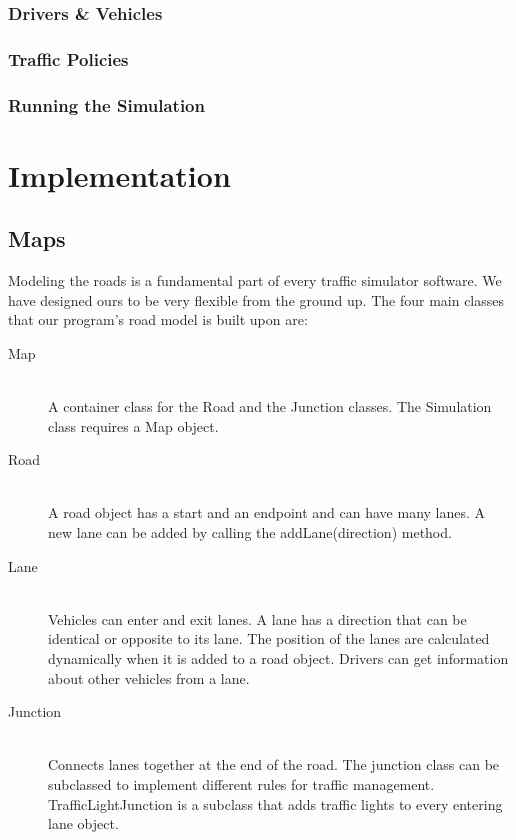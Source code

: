 \documentclass[11pt]{article}
\begin{document}
\subsubsection{Drivers \& Vehicles}
\subsubsection{Traffic Policies}
\subsubsection{Running the Simulation}
	
	
\newpage
\section{Implementation}

\subsection{Maps}

Modeling the roads is a fundamental part of every traffic simulator software. We have designed ours to be very flexible from the ground up. The four main classes that our program's road model is built upon are:

\begin{description}
  \item[Map] \hfill \\
  A container class for the Road and the Junction classes. The Simulation class requires a Map object.
  \item[Road] \hfill \\
  A road object has a start and an endpoint and can have many lanes. A new lane can be added by calling the addLane(direction) method.
  \item[Lane] \hfill \\
  Vehicles can enter and exit lanes. A lane has a direction that can be identical or opposite to its lane. The position of the lanes are calculated dynamically when it is added to a road object. Drivers can get information about other vehicles from a lane.
  \item[Junction] \hfill \\
  Connects lanes together at the end of the road. The junction class can be subclassed to implement different rules for traffic management. TrafficLightJunction is a subclass that adds traffic lights to every entering lane object.
\end{description}
\end{document}
